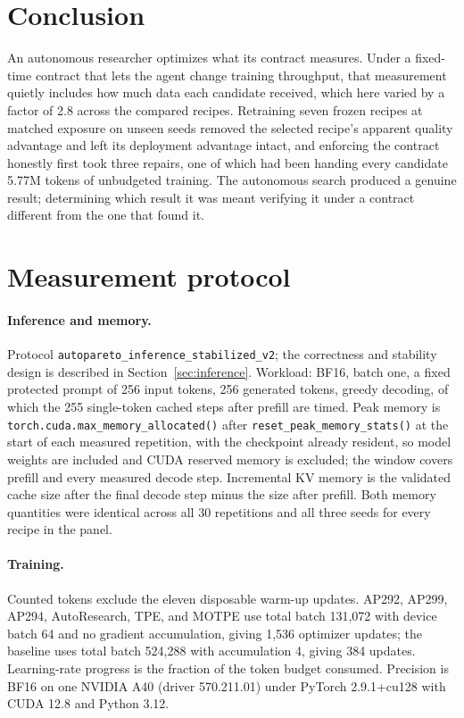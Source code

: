 \documentclass{article}
\begin{document}
\section{Conclusion}
An autonomous researcher optimizes what its contract measures. Under a fixed-time contract that lets the agent change training throughput, that measurement quietly includes how much data each candidate received, which here varied by a factor of 2.8 across the compared recipes. Retraining seven frozen recipes at matched exposure on unseen seeds removed the selected recipe's apparent quality advantage and left its deployment advantage intact, and enforcing the contract honestly first took three repairs, one of which had been handing every candidate 5.77M tokens of unbudgeted training. The autonomous search produced a genuine result; determining which result it was meant verifying it under a contract different from the one that found it.

\appendix
\section{Measurement protocol}\label{app:measure}
\paragraph{Inference and memory.} Protocol \texttt{autopareto\_inference\_stabilized\_v2}; the correctness and stability design is described in Section~\ref{sec:inference}. Workload: BF16, batch one, a fixed protected prompt of 256 input tokens, 256 generated tokens, greedy decoding, of which the 255 single-token cached steps after prefill are timed. Peak memory is \texttt{torch.cuda.max\_memory\_allocated()} after \texttt{reset\_peak\_memory\_stats()} at the start of each measured repetition, with the checkpoint already resident, so model weights are included and CUDA reserved memory is excluded; the window covers prefill and every measured decode step. Incremental KV memory is the validated cache size after the final decode step minus the size after prefill. Both memory quantities were identical across all 30 repetitions and all three seeds for every recipe in the panel.

\paragraph{Training.} Counted tokens exclude the eleven disposable warm-up updates. AP292, AP299, AP294, AutoResearch, TPE, and MOTPE use total batch 131,072 with device batch 64 and no gradient accumulation, giving 1,536 optimizer updates; the baseline uses total batch 524,288 with accumulation 4, giving 384 updates. Learning-rate progress is the fraction of the token budget consumed. Precision is BF16 on one NVIDIA A40 (driver 570.211.01) under PyTorch 2.9.1+cu128 with CUDA 12.8 and Python 3.12.
\end{document}
